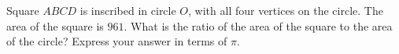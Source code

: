 Square $ABCD$ is inscribed in circle $O$, with all four vertices on the circle. The area of the square is $961$. What is the ratio of the area of the square to the area of the circle? Express your answer in terms of $\pi$.
